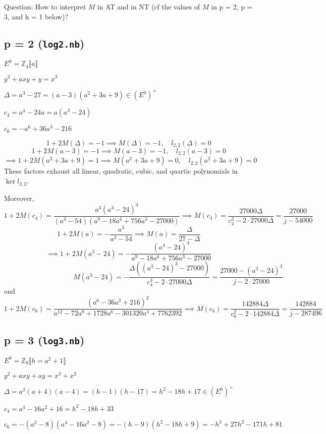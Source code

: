 \documentclass{rs}
\theoremstyle{definition}
\theoremstyle{remark}
\newcommand{\mb}[1]{\mathbb{#1}}
\newcommand{\BZ}{{\mb Z}}
\newcommand{\lb}{\llbracket}
\newcommand{\rb}{\rrbracket}
\numberwithin{equation}{section}
\numberwithin{thm}{section}
\begin{document}
Question: How to interpret $M$ in AT and in NT (cf the values of $M$ in p = 2, p = 3, and h = 1 below)?  


\subsection{p = 2 (\texttt{log2.nb})}

$E^0 = \BZ_4 \lb a \rb$ 

$y^2 + a x y + y = x^3$ 

$\Delta = a^3 - 27 = (a - 3) (a^2 + 3 a + 9) \in (E^0)^\times$ 

$c_4 = a^4 - 24 a = a (a^3 - 24)$ 

$c_6 = -a^6 + 36 a^3 - 216$ 

\[
 1 + 2 M(\Delta) = -1 \implies M(\Delta) = -1, \quad l_{2,2}(\Delta) = 0 
\]
\[
 1 + 2 M(a - 3) = -1 \implies M(a - 3) = -1, \quad l_{2,2}(a - 3) = 0 
\]
\[
 \implies 1 + 2 M(a^2 + 3 a + 9) = 1 \implies M(a^2 + 3 a + 9) = 0, \quad l_{2,2}(a^2 + 3 a + 9) = 0 
\]
These factors exhaust all linear, quadratic, cubic, and quartic polynomials in $\ker l_{2,2}$.  

Moreover, 
\[
 1 + 2 M(c_4) = \frac{a^3 (a^3 - 24)^3}{(a^3 - 54) (a^9 - 18 a^6 + 756 a^3 - 27000)} \implies M(c_4) = \frac{27000 \Delta}{c_4^3 - 2 \cdot 27000 \Delta} = \frac{27000}{j - 54000} 
\]
\[
 1 + 2 M(a) = -\frac{a^3}{a^3 - 54} \implies M(a) = \frac{\Delta}{27 - \Delta} 
\]
\[
 \implies 1 + 2 M(a^3 - 24) = -\frac{(a^3 - 24)^3}{a^9 - 18 a^6 + 756 a^3 - 27000} 
\]
\[
 \qquad \qquad \qquad \qquad \qquad M(a^3 - 24) = -\frac{\Delta ((a^3 - 24)^3 - 27000)}{c_4^3 - 2 \cdot 27000 \Delta} = \dfrac{27000 - (a^3 - 24)^3}{j - 2 \cdot 27000} 
\]
and 
\[
 1 + 2 M(c_6) = \frac{(a^6 - 36 a^3 + 216)^2}{a^{12} - 72 a^9 + 1728 a^6 -301320 a^3 + 7762392} 
 \implies M(c_6) = \frac{142884 \Delta}{c_6^2 - 2 \cdot 142884 \Delta} = \frac{142884}{j - 287496} 
\]


\subsection{p = 3 (\texttt{log3.nb})}

$E^0 = \BZ_9 \lb h = a^2 + 1 \rb$ 

$y^2 + a x y + a y = x^3 + x^2$ 

$\Delta = a^2 (a + 4) (a - 4) = (h - 1) (h - 17) = h^2 - 18 h + 17 \in (E^0)^\times$ 

$c_4 = a^4 - 16 a^2 + 16 = h^2 - 18 h + 33$ 

$c_6 = -(a^2 - 8) (a^4 - 16 a^2 - 8) = -(h - 9) (h^2 - 18 h + 9) = -h^3 + 27 h^2 - 171 h + 81$ 
\end{document}
